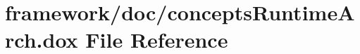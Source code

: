 \hypertarget{concepts_runtime_arch_8dox}{}\section{framework/doc/concepts\+Runtime\+Arch.dox File Reference}
\label{concepts_runtime_arch_8dox}
